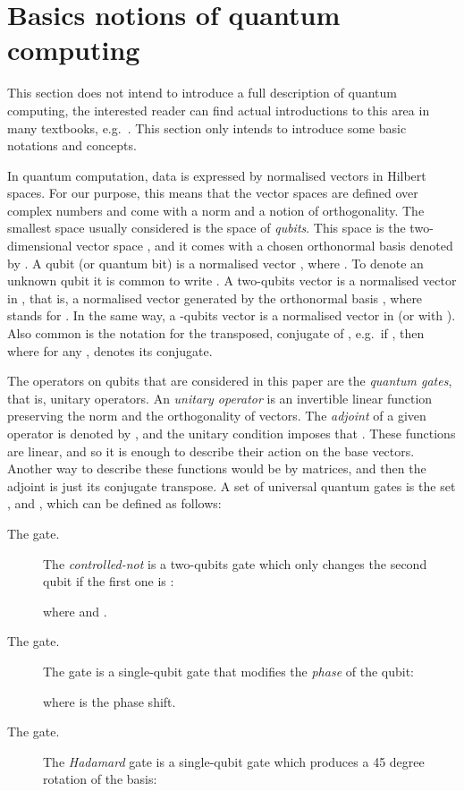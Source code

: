\documentclass[preprint]{elsarticle}
\begin{document}
\section{Basics notions of quantum computing}\label{sec:QC}
This section does not intend to introduce a full description of quantum
computing, the interested reader can find actual introductions to this area in
many textbooks, e.g.~\cite{NielsenChuang00,Jaeger07}. This section only intends
to introduce some basic notations and concepts.

In quantum computation, data is expressed by normalised vectors in Hilbert
spaces. For our purpose, this means that the vector spaces are defined over
complex numbers and come with a norm and a notion of orthogonality. The smallest
space usually considered is the space of {\em qubits}. This space is the
two-dimensional vector space , and it comes with a chosen
orthonormal basis denoted by . A qubit (or quantum bit) is a
normalised vector , where .
To denote an unknown qubit  it is common to write . A
two-qubits vector is a normalised vector in ,
that is, a normalised vector generated by the orthonormal basis
, where  stands for
. In the same way, a -qubits vector is a normalised
vector in  (or  with ). Also common is
the notation  for the transposed, conjugate of , e.g.~if
, then
 where for any
,  denotes its conjugate.

The operators on qubits that are considered in this paper are the {\em quantum
gates}, that is, unitary operators. An {\em unitary operator} is an invertible linear
function preserving the norm and the orthogonality of vectors. The {\em adjoint}
of a given operator  is denoted by , and the unitary condition
imposes that . These functions are linear, and so it is enough
to describe their action on the base vectors. Another way to describe these
functions would be by matrices, and then the adjoint is just its conjugate
transpose. A set of universal quantum gates is the set ,
 and , which can be defined as follows:
\begin{description}
\item[The  gate.] The {\em controlled-not} is a two-qubits gate which only changes the second qubit if the first one is :
  
  where  and .
\item[The  gate.] The  gate is a
  single-qubit gate that modifies the {\em phase} of the qubit:
  
  where  is the phase shift.
\item[The  gate.] The {\em Hadamard} gate is a single-qubit gate which
  produces a 45 degree rotation of the basis:
  
\end{description}
\end{document}
